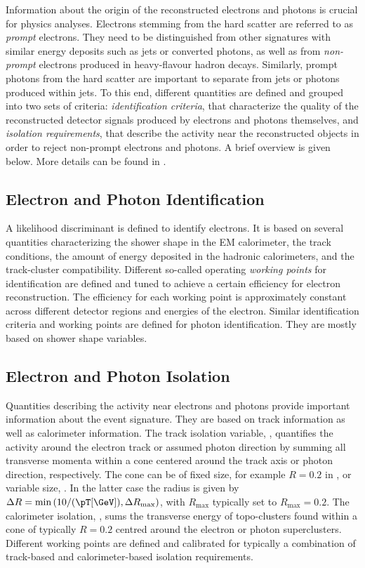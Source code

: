 Information about the origin of the reconstructed electrons and photons is crucial for physics analyses.
Electrons stemming from the hard scatter are referred to as \emph{prompt} electrons. They need to be distinguished from other signatures with similar energy deposits such as jets or converted photons, as well as from \emph{non-prompt} electrons produced in heavy-flavour hadron decays.
Similarly, prompt photons from the hard scatter are important to separate from jets or photons produced within jets.
To this end, different quantities are defined and grouped into two sets of criteria: \emph{identification criteria}, that characterize the quality of the reconstructed detector signals produced by electrons and photons themselves, and \emph{isolation requirements}, that describe the activity near the reconstructed objects in order to reject non-prompt electrons and photons. A brief overview is given below. More details can be found in .

\subsection{Electron and Photon Identification}
A likelihood discriminant is defined to identify electrons. It is based on several quantities characterizing the shower shape in the EM calorimeter, the track conditions, the amount of energy deposited in the hadronic calorimeters, and the track-cluster compatibility. Different so-called operating \emph{working points} for identification are defined and tuned to achieve a certain efficiency for electron reconstruction. The efficiency for each working point is approximately constant across different detector regions and energies of the electron.
Similar identification criteria and working points are defined for photon identification. They are mostly based on shower shape variables.

\subsection{Electron and Photon Isolation}
Quantities describing the activity near electrons and photons provide important information about the event signature. They are based on track information as well as calorimeter information.
The track isolation variable, \pTcone, quantifies the activity around the electron track or assumed photon direction by summing all transverse momenta within a cone centered around the track axis or photon direction, respectively. The cone can be of fixed size, for example $R=0.2$ in \pTconetwenty, or variable size, \pTvarcone. In the latter case the radius is given by $\Delta R = \text{min} \left( 10 / (\pT \text{[\GeV])}, \Delta R_{\text{max}}  \right)$, with $R_{\text{max}}$ typically set to $R_{\text{max}} = 0.2$.
The calorimeter isolation, \ETconetwenty, sums the transverse energy of topo-clusters found within a cone of typically $R=0.2$ centred around the electron or photon superclusters.
Different working points are defined and calibrated for typically a combination of track-based and calorimeter-based isolation requirements.


